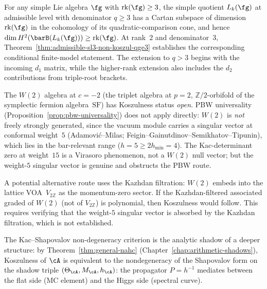 \begin{conjecture}%
\label{conj:admissible-koszul-rank-obstruction}%
\ClaimStatusConjectured
{}%
For any simple Lie algebra $\fg$ with $\mathrm{rk}(\fg) \geq 3$,
the simple quotient $L_k(\fg)$ at admissible level with
denominator $q \geq 3$ has a Cartan subspace of dimension
$\mathrm{rk}(\fg)$ in the cohomology of its quadratic-comparison
cone, and hence
$\dim H^2(\barB(L_k(\fg))) \geq \mathrm{rk}(\fg)$.  At rank~$2$
and denominator~$3$, Theorem~\ref{thm:admissible-sl3-non-koszul-qge3}
establishes the corresponding conditional finite-model statement.
The extension to $q>3$ begins with the incoming $d_1$ matrix, while
the higher-rank extension also includes the $d_2$ contributions from
triple-root brackets.
\end{conjecture}

\begin{remark}[$W(2)$ at $c = -2$: Koszulness status]
\label{rem:w2-koszulness}
%
%
%
The $W(2)$ algebra at $c = -2$ (the triplet algebra at $p = 2$,
$\mathbb{Z}/2$-orbifold of the symplectic fermion
algebra~$\mathrm{SF}$) has Koszulness status \emph{open}.
PBW universality
\textup{(}Proposition~\ref{prop:pbw-universality}\textup{)} does
not apply directly: $W(2)$ is \emph{not} freely strongly
generated, since the vacuum module carries a singular vector at
conformal weight~$5$
\textup{(}Adamovi\'c--Milas;
Feigin--Gainutdinov--Semikhatov--Tipunin\textup{)},
which lies in the bar-relevant range ($h = 5 \geq 2 h_{\min} = 4$).
The Kac-determinant zero at weight~$15$ is a
Virasoro phenomenon, not a $W(2)$ null vector; but the
weight-$5$ singular vector is genuine and obstructs the PBW route.

A potential alternative route uses the Kazhdan filtration:
$W(2)$ embeds into the lattice VOA~$V_{2\mathbb{Z}}$ as the
momentum-zero sector. If the Kazhdan-filtered associated graded
of $W(2)$ (not of $V_{2\mathbb{Z}}$) is polynomial, then
Koszulness would follow. This requires verifying that
the weight-$5$ singular vector is absorbed by the Kazhdan
filtration, which is not established.
\end{remark}

\begin{remark}
\label{rem:kac-shapovalov-arithmetic-shadow}
The Kac--Shapovalov non-degeneracy criterion is the analytic shadow of a deeper structure: by
Theorem~\ref{thm:general-nahc} (Chapter~\ref{chap:arithmetic-shadows}), Koszulness of $\cA$
is equivalent to the nondegeneracy of the Shapovalov form on the
shadow triple $(\Theta_\cA, M_\cA, h_\cA)$: the propagator
$P = h^{-1}$ mediates between the flat side (MC element) and the
Higgs side (spectral curve).
\end{remark}

